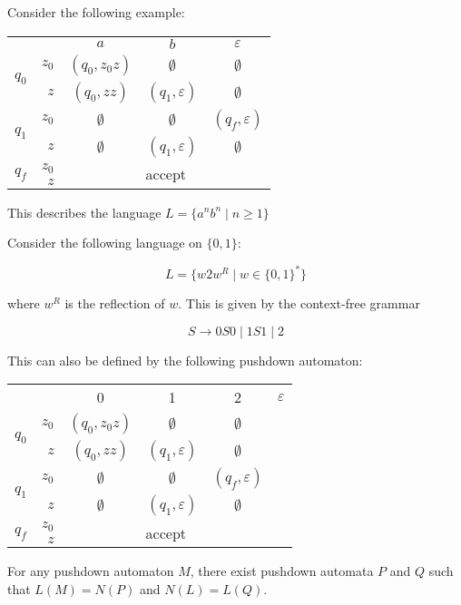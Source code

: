 Consider the following example:

\begin{center}\begin{tabular}{l r c c c}
    & & \(a\) & \(b\) & \(\varepsilon \) \\\cmidrule{3-5}
    \multirow{2}{*}{\(q_0\)} & \(z_0\) & \((q_0, z_0z)\) & \(\emptyset \) & \(\emptyset \) \\
    & \(z\) & \((q_0, zz)\)  & \((q_1, \varepsilon) \) & \(\emptyset \) \\\midrule
    \multirow{2}{*}{\(q_1\)} & \(z_0\) & \(\emptyset \) & \(\emptyset \) & \((q_f, \varepsilon)\) \\
    & \(z\) & \(\emptyset \) & \((q_1, \varepsilon)\) & \(\emptyset \) \\\midrule
    \multirow{2}{*}{\(q_f\)} & \(z_0\) & \multicolumn{3}{c}{\multirow{2}{*}{accept}}\\
    & \(z\) & & &\\
\end{tabular}\end{center}



This describes the language \(L=\{a^n b^n\mid n\geq1\} \)

Consider the following language on \( \{0, 1\} \):

\[L=\{w2w^R \mid w\in {\{0, 1\}}^*\} \]

where \(w^R\) is the reflection of \(w\). This is given by the context-free grammar 

\[S\to 0S0\mid 1S1\mid 2\]

This can also be defined by the following pushdown automaton:

\begin{center}\begin{tabular}{l r c c c c}
    & & 0 & 1 & 2 & \(\varepsilon \) \\\cmidrule{3-6}
    \multirow{2}{*}{\(q_0\)} & \(z_0\) & \((q_0, z_0z)\) & \(\emptyset \) & \(\emptyset \) \\
    & \(z\) & \((q_0, zz)\)  & \((q_1, \varepsilon) \) & \(\emptyset \) \\\midrule
    \multirow{2}{*}{\(q_1\)} & \(z_0\) & \(\emptyset \) & \(\emptyset \) & \((q_f, \varepsilon)\) \\
    & \(z\) & \(\emptyset \) & \((q_1, \varepsilon)\) & \(\emptyset \) \\\midrule
    \multirow{2}{*}{\(q_f\)} & \(z_0\) & \multicolumn{3}{c}{\multirow{2}{*}{accept}}\\
    & \(z\) & & &\\
\end{tabular}\end{center}

\begin{theorem}
    For any pushdown automaton \(M\), there exist pushdown automata \(P\) and \(Q\) such that \(L(M)=N(P)\) and \(N(L)=L(Q)\).
\end{theorem}